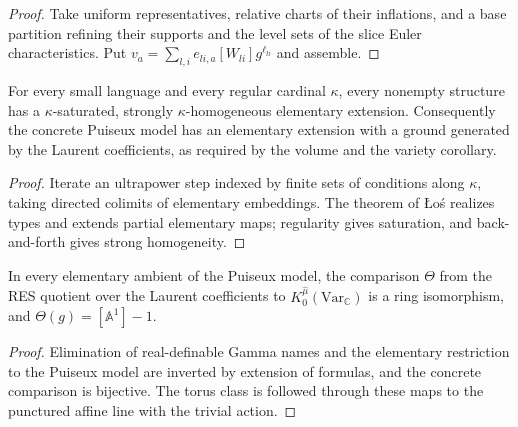 \begin{proof}
Take uniform representatives, relative charts of their inflations, and a base partition refining their supports and the level sets of the slice Euler characteristics. Put $v_a=\sum_{l,i}e_{li,a}[W_{li}]g^{\ell_{li}}$ and assemble.
\end{proof}

\begin{lemma}
\label{ambient}
\leanok
{}
For every small language and every regular cardinal $\kappa$, every nonempty structure has a $\kappa$-saturated, strongly $\kappa$-homogeneous elementary extension. Consequently the concrete Puiseux model has an elementary extension with a ground generated by the Laurent coefficients, as required by the volume and the variety corollary.
\end{lemma}

\begin{proof}
Iterate an ultrapower step indexed by finite sets of conditions along $\kappa$, taking directed colimits of elementary embeddings. The theorem of {\L}o\'s realizes types and extends partial elementary maps; regularity gives saturation, and back-and-forth gives strong homogeneity.
\end{proof}

\begin{lemma}
\label{theta}
\leanok
{}
In every elementary ambient of the Puiseux model, the comparison $\Theta$ from the RES quotient over the Laurent coefficients to $K_0^{\widehat\mu}(\mathrm{Var}_{\mathbb C})$ is a ring isomorphism, and $\Theta(g)=[\mathbb A^1]-1$.
\end{lemma}

\begin{proof}
Elimination of real-definable Gamma names and the elementary restriction to the Puiseux model are inverted by extension of formulas, and the concrete comparison is bijective. The torus class is followed through these maps to the punctured affine line with the trivial action.
\end{proof}

